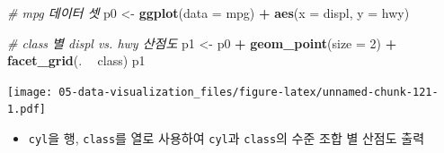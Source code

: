 \documentclass[
  11pt,
]{krantz}
\newenvironment{Shaded}{\begin{snugshade}}{\end{snugshade}}
\newcommand{\CommentTok}[1]{\textcolor[rgb]{0.37,0.37,0.37}{\textit{#1}}}
\newcommand{\DataTypeTok}[1]{\textcolor[rgb]{0.27,0.27,0.27}{#1}}
\newcommand{\DecValTok}[1]{\textcolor[rgb]{0.06,0.06,0.06}{#1}}
\newcommand{\FloatTok}[1]{\textcolor[rgb]{0.06,0.06,0.06}{#1}}
\newcommand{\KeywordTok}[1]{\textcolor[rgb]{0.27,0.27,0.27}{\textbf{#1}}}
\newcommand{\NormalTok}[1]{#1}
\newcommand{\OperatorTok}[1]{\textcolor[rgb]{0.43,0.43,0.43}{\textbf{#1}}}
\newcommand{\StringTok}[1]{\textcolor[rgb]{0.5,0.5,0.5}{#1}}
\providecommand{\tightlist}{%
  \setlength{\itemsep}{0pt}\setlength{\parskip}{0pt}}
\begin{document}
\normalsize

\footnotesize

\begin{Shaded}
\begin{Highlighting}[]
\CommentTok{# mpg 데이터 셋}
\NormalTok{p0 <-}\StringTok{ }\KeywordTok{ggplot}\NormalTok{(}\DataTypeTok{data =}\NormalTok{ mpg) }\OperatorTok{+}\StringTok{ }
\StringTok{  }\KeywordTok{aes}\NormalTok{(}\DataTypeTok{x =}\NormalTok{ displ, }\DataTypeTok{y =}\NormalTok{ hwy)}

\CommentTok{# class 별 displ vs. hwy 산점도}
\NormalTok{p1 <-}\StringTok{ }\NormalTok{p0 }\OperatorTok{+}\StringTok{ }
\StringTok{  }\KeywordTok{geom_point}\NormalTok{(}\DataTypeTok{size =} \DecValTok{2}\NormalTok{) }\OperatorTok{+}\StringTok{ }
\StringTok{  }\KeywordTok{facet_grid}\NormalTok{(. }\OperatorTok{~}\StringTok{ }\NormalTok{class)}
\NormalTok{p1}
\end{Highlighting}
\end{Shaded}

\texttt{[image: 05-data-visualization\_files/figure-latex/unnamed-chunk-121-1.pdf]}

\normalsize

\begin{itemize}
\tightlist
\item
  \texttt{cyl}을 행, \texttt{class}를 열로 사용하여 \texttt{cyl}과 \texttt{class}의 수준 조합 별 산점도 출력
\end{itemize}

\footnotesize

\begin{Shaded}
\end{Shaded}
\end{document}
